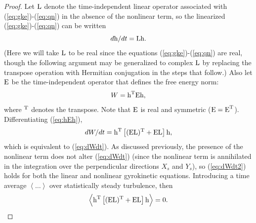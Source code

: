 \documentclass{jpp}
\begin{document}
\begin{proof}
Let $\boldsymbol{$L$}$ denote the time-independent linear operator associated with (\ref{eq:gke})-(\ref{eq:qn})
in the absence of the nonlinear term,
so the linearized (\ref{eq:gke})-(\ref{eq:qn}) can be written
\begin{equation}
d\boldsymbol{$h$}/dt = \boldsymbol{$L$}\boldsymbol{$h$}.
\end{equation}
(Here we will take $\boldsymbol{$L$}$ to be real since the equations (\ref{eq:gke})-(\ref{eq:qn})
are real, though the following argument may be generalized to complex
$\boldsymbol{$L$}$ by replacing the transpose operation with Hermitian conjugation
in the steps that follow.)
Also let $\boldsymbol{$E$}$ be the time-independent operator that defines the free energy norm:
\begin{equation}
W = \boldsymbol{$h$}^{\mathrm{T}} \boldsymbol{$E$} \boldsymbol{$h$},
\label{eq:hEh}
\end{equation}
where $^{\mathrm{T}}$ denotes the transpose. Note that $\boldsymbol{$E$}$ is real and symmetric
($\boldsymbol{$E$} = \boldsymbol{$E$}^{\mathrm{T}}$). Differentiating (\ref{eq:hEh}),
\begin{equation}
\label{eq:dWdt2}
dW/dt = \boldsymbol{$h$}^{\mathrm{T}} \left[ (\boldsymbol{$E$}\boldsymbol{$L$})^{\mathrm{T}} + \boldsymbol{$E$}\boldsymbol{$L$} \right] \boldsymbol{$h$},
\end{equation}
which is equivalent to (\ref{eq:dWdt}). As discussed previously, the presence of the nonlinear term
does not alter (\ref{eq:dWdt}) (since the nonlinear term is annihilated in the integration over
the perpendicular directions $X_s$ and $Y_s$),
so (\ref{eq:dWdt2}) holds for both the linear and nonlinear gyrokinetic equations.
Introducing a time average $\left< \ldots \right>$ over statistically steady turbulence, then
\begin{equation}
\label{eq:avg}
\left< \boldsymbol{$h$}^{\mathrm{T}} \left[ (\boldsymbol{$E$}\boldsymbol{$L$})^{\mathrm{T}} + \boldsymbol{$E$}\boldsymbol{$L$} \right] \boldsymbol{$h$} \right>
=0.
\end{equation}


\end{proof}
\end{document}
